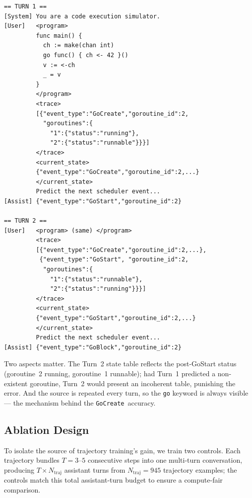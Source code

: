 \documentclass[10pt,conference]{IEEEtran}
\newcommand{\ecreate}{\texttt{GoCreate}}
\begin{document}
\begin{lstlisting}[float, caption={A 2-turn trajectory example (abridged to
fit). The model's Turn 1 prediction (GoStart g2) is appended before
Turn 2 as the next trace event. Turn 2 requests the following event,
conditioning on the updated goroutine state. Loss is applied only to
the assistant turns.},
label={lst:traj}]
== TURN 1 ==
[System] You are a code execution simulator.
[User]   <program>
         func main() {
           ch := make(chan int)
           go func() { ch <- 42 }()
           v := <-ch
           _ = v
         }
         </program>
         <trace>
         [{"event_type":"GoCreate","goroutine_id":2,
           "goroutines":{
             "1":{"status":"running"},
             "2":{"status":"runnable"}}}]
         </trace>
         <current_state>
         {"event_type":"GoCreate","goroutine_id":2,...}
         </current_state>
         Predict the next scheduler event...
[Assist] {"event_type":"GoStart","goroutine_id":2}

== TURN 2 ==
[User]   <program> (same) </program>
         <trace>
         [{"event_type":"GoCreate","goroutine_id":2,...},
          {"event_type":"GoStart", "goroutine_id":2,
           "goroutines":{
             "1":{"status":"runnable"},
             "2":{"status":"running"}}}]
         </trace>
         <current_state>
         {"event_type":"GoStart","goroutine_id":2,...}
         </current_state>
         Predict the next scheduler event...
[Assist] {"event_type":"GoBlock","goroutine_id":2}
\end{lstlisting}

Two aspects matter.
The Turn~2 state table reflects the post-GoStart status (goroutine~2
running, goroutine~1 runnable); had Turn~1 predicted a non-existent
goroutine, Turn~2 would present an incoherent table, punishing the
error.
And the source is repeated every turn, so the \texttt{go} keyword is
always visible — the mechanism behind the \ecreate\ accuracy.

\subsection{Ablation Design}\label{sec:ablation}

To isolate the source of trajectory training's gain, we train two controls.
Each trajectory bundles $T{=}3$--$5$ consecutive steps into one multi-turn conversation, producing $T{\times}N_\text{traj}$ assistant turns from $N_\text{traj}{=}945$ trajectory examples; the controls match this total assistant-turn budget to ensure a compute-fair comparison.
\end{document}
